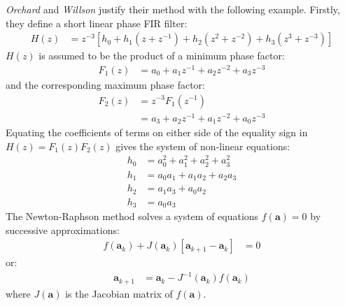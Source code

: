\documentclass[a4paper,twoside,10pt,english]{report}
\begin{document}
\emph{Orchard} and \emph{Willson} justify their method with the following
example. Firstly, they define a short linear phase FIR filter:
\begin{align*}
  H\left(z\right) &= z^{-3}\left[h_{0}+h_{1}\left(z+z^{-1}\right)+
                    h_{2}\left(z^{2}+z^{-2}\right)+
                    h_{3}\left(z^{3}+z^{-3}\right)\right]
\end{align*}
$H\left(z\right)$ is assumed to be the product of a minimum phase factor:
\begin{align*}
  F_{1}\left(z\right) &= a_{0}+a_{1}z^{-1}+a_{2}z^{-2}+a_{3}z^{-3}
\end{align*}
and the corresponding maximum phase factor:
\begin{align*}
  F_{2}\left(z\right) &= z^{-3}F_{1}\left(z^{-1}\right) \\
                      &= a_{3}+a_{2}z^{-1}+a_{1}z^{-2}+a_{0}z^{-3}
\end{align*}
Equating the coefficients of terms on either side of the equality sign in 
$H\left(z\right)=F_{1}\left(z\right)F_{2}\left(z\right)$ gives the system of
non-linear equations:
\begin{align*}
  h_{0} &= a_{0}^{2}+a_{1}^{2}+a_{2}^{2}+a_{3}^{2} \\
  h_{1} &= a_{0}a_{1} + a_{1}a_{2}  + a_{2}a_{3} \\
  h_{2} &= a_{1}a_{3} + a_{0}a_{2} \\
  h_{3} &= a_{0}a_{3}
\end{align*}
The Newton-Raphson method solves a system of equations
$f\left(\boldsymbol{a}\right)=0$ 
by successive approximations:
\begin{align*}
    f\left(\boldsymbol{a}_{k}\right)+
  J\left(\boldsymbol{a}_{k}\right)
  \left[\boldsymbol{a}_{k+1}-\boldsymbol{a}_{k}\right] &=0
\end{align*}
or:
\begin{align*}
  \boldsymbol{a}_{k+1}
  &= \boldsymbol{a}_{k}
    -J^{-1}\left(\boldsymbol{a}_{k}\right)f\left(\boldsymbol{a}_{k}\right)
\end{align*}
where $J\left(\boldsymbol{a}\right)$ is the Jacobian matrix of
$f\left(\boldsymbol{a}\right)$.
\end{document}
